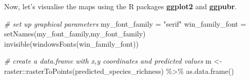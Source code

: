\documentclass[
]{article}
\newenvironment{Shaded}{\begin{snugshade}}{\end{snugshade}}
\newcommand{\CommentTok}[1]{\textcolor[rgb]{0.56,0.35,0.01}{\textit{#1}}}
\newcommand{\FunctionTok}[1]{\textcolor[rgb]{0.00,0.00,0.00}{#1}}
\newcommand{\NormalTok}[1]{#1}
\newcommand{\OtherTok}[1]{\textcolor[rgb]{0.56,0.35,0.01}{#1}}
\newcommand{\SpecialCharTok}[1]{\textcolor[rgb]{0.00,0.00,0.00}{#1}}
\newcommand{\StringTok}[1]{\textcolor[rgb]{0.31,0.60,0.02}{#1}}
\begin{document}
Now, let's visualise the maps using the R packages \textbf{ggplot2} and
\textbf{ggpubr}.

\begin{Shaded}
\begin{Highlighting}[]

\CommentTok{\# set up graphical parameters}
\NormalTok{my\_font\_family }\OtherTok{=} \StringTok{"serif"}
\NormalTok{win\_family\_font }\OtherTok{=} \FunctionTok{setNames}\NormalTok{(my\_font\_family,my\_font\_family)}
\FunctionTok{invisible}\NormalTok{(}\FunctionTok{windowsFonts}\NormalTok{(win\_family\_font))}

\CommentTok{\# create a data.frame with x,y coordinates and predicted values}
\NormalTok{m }\OtherTok{\textless{}{-}}\NormalTok{ raster}\SpecialCharTok{::}\FunctionTok{rasterToPoints}\NormalTok{(predicted\_species\_richness) }\SpecialCharTok{\%\textgreater{}\%}
  \FunctionTok{as.data.frame}\NormalTok{()}


\end{Highlighting}
\end{Shaded}
\end{document}
